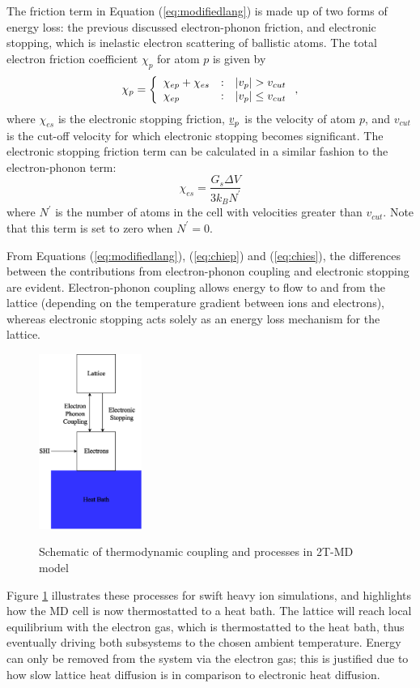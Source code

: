 The friction term in Equation (\ref{eq:modifiedlang}) is made up of two
forms of energy loss: the previous discussed electron-phonon friction,
and electronic stopping, which is inelastic electron scattering of ballistic
atoms. The total electron friction coefficient $\chi_p$ for atom $p$ is given by
\begin{equation}
\chi_{p} = \left\{ \begin{array} {l@{\quad:\quad}l}
\chi_{ep} + \chi_{es} & | v_p | > v_{cut} \\
\chi_{ep} & | v_p | \le v_{cut}
\end{array} \right. ,
\end{equation}
where $\chi_{es}$ is the electronic stopping friction, $\mbox{$\underline{v}$}_{p}$ is
the velocity of atom $p$, and $v_{cut}$ is the cut-off velocity for which
electronic stopping becomes significant. The electronic stopping
friction term can be calculated in a similar fashion to the electron-phonon
term:
\begin{equation} \label{eq:chies}
\chi_{es} = \frac{G_{s} \Delta V}{3 k_B N^{\prime}}
\end{equation}
where $N^{\prime}$ is the number of atoms in the cell with velocities
greater than $v_{cut}$. Note that this term is set to zero when $N^{\prime} = 0$.

From Equations (\ref{eq:modifiedlang}), (\ref{eq:chiep}) and (\ref{eq:chies}),
the differences between the contributions from electron-phonon coupling
and electronic stopping are evident. Electron-phonon coupling allows energy
to flow to and from the lattice (depending on the temperature gradient between
ions and electrons), whereas electronic stopping acts solely as an energy
loss mechanism for the lattice.
\begin{figure}[ht]
	\centering
	{
		\includegraphics[width=0.3\textwidth]{ttmheatbath}
	}
	\caption{Schematic of thermodynamic coupling and processes in 2T-MD model}
	\label{fig:heatbath}
\end{figure}
Figure \ref{fig:heatbath} illustrates these processes for swift heavy ion
simulations, and highlights how the MD cell is now thermostatted
to a heat bath. The lattice will reach local equilibrium with the electron gas,
which is thermostatted to the heat bath, thus eventually driving both
subsystems to the chosen ambient temperature. Energy can only be
removed from the system via the electron gas; this is justified due to how
slow lattice heat diffusion is in comparison to electronic heat diffusion.

